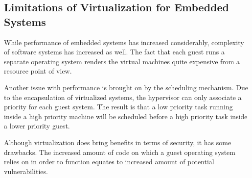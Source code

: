 \subsection{Limitations of Virtualization for Embedded Systems}
\label{subsec:limitvirt}

While performance of embedded systems has increased considerably, complexity of software systems has increased as well. The fact that each guest runs a separate operating system renders the virtual machines quite expensive from a resource point of view.

Another issue with performance is brought on by the scheduling mechanism. Due to the encapsulation of virtualized systems, the hypervisor can only associate a priority for each guest system. The result is that a low priority task running inside a high priority machine will be scheduled before a high priority task inside a lower priority guest.

Although virtualization does bring benefits in terms of security, it has some drawbacks. The increased amount of code on which a guest operating system relies on in order to function equates to increased amount of potential vulnerabilities.

